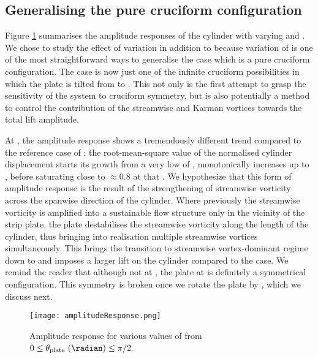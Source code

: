 \documentclass[a4paper]{article}
\begin{document}
\subsection{Generalising the pure cruciform configuration}

Figure \ref{fig:ampresp} summarises the amplitude responses of the cylinder with varying \ured{} and \ptlt{}. We chose to study the effect of \ptlt{} variation in addition to \ured{} because variation of \ptlt{} is one of the most straightforward ways to generalise the \rfo{} case which is a pure cruciform configuration. The \rfo{} case is now just one of the infinite cruciform possibilities in which the plate is tilted from \rze{} to \rfo{}. This not only is the first attempt to grasp the sensitivity of the system to cruciform symmetry, but is also potentially a method to control the contribution of the streamwise and Karman vortices towards the total lift amplitude.

At \ptlt{} \es{} \rze{}, the amplitude response shows a tremendously different trend compared to the reference case of \ptlt{} \es{} \rfo{}: the root-mean-square value of the normalised cylinder displacement \yrms{} starts its growth from a very low \ured{} of \urfo{}, monotonically increases up to \ured{} \es{} \urei{}, before saturating close to \yrms{} $\approx 0.8$ at that \ured{}. We hypothesize that this form of amplitude response is  the result of the strengthening of streamwise vorticity across the spanwise direction of the cylinder. Where previously the streamwise vorticity is amplified into a sustainable flow structure only in the vicinity of the strip plate, the \rze{} plate destabilises the streamwise vorticity along the length of the cylinder, thus bringing into realisation multiple streamwise vortices simultaneously. This brings the transition to streamwise vortex-dominant regime down to \ured{} \es{} \urfo{} and imposes a larger lift on the cylinder compared to the \rfo{} case. We remind the reader that although not at \rfo{}, the plate at \rze{} is definitely a symmetrical configuration. This symmetry is broken once we rotate the plate by \ron{}, which we discuss next.

\begin{figure}[h]
  \centering
  \texttt{[image: amplitudeResponse.png]}
  \caption{Amplitude response for various values of \ptlt{} from $0 \leq \theta_{\text{plate}} \text{ (\radian)} \leq \pi/2$.}
  \label{fig:ampresp}
\end{figure}
\end{document}

